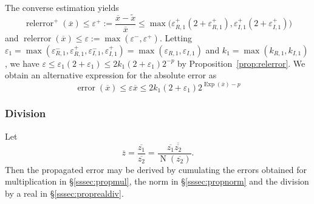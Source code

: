 \documentclass {article}
\newcommand {\corr}[1]{\widetilde {#1}}
\newcommand {\appro}[1]{\overline {#1}}
\DeclareMathOperator{\Exp}{\operatorname {Exp}}
\newcommand{\error}{\operatorname {error}}
\newcommand{\relerror}{\operatorname {relerror}}
\newcommand{\Norm}{\operatorname {N}}
\renewcommand {\epsilon}{\varepsilon}
\renewcommand {\leq}{\leqslant}
\begin{document}
The converse estimation yields
\begin {equation}
\label {eq:propnormepsplus}
\relerror^+ (\appro x)
\leq
\epsilon^+
:=
\frac {\appro x - \corr x}{\appro x}
\leq
\max \big(
   \epsilon_{R, 1}^+ (2 + \epsilon_{R, 1}^+),
   \epsilon_{I, 1}^+ (2 + \epsilon_{I, 1}^+)
\big)
\end {equation}
and $\relerror (\appro x) \leq \epsilon := \max (\epsilon^-, \epsilon^+)$.
Letting
$\epsilon_1 = \max ( \epsilon_{R, 1}^-, \epsilon_{R, 1}^+,
                     \epsilon_{I, 1}^-, \epsilon_{I, 1}^+ )
            = \max ( \epsilon_{R, 1},   \epsilon_{I, 1} )$
and $k_1 = \max ( k_{R, 1}, k_{I, 1})$,
we have
$\epsilon \leq \epsilon_1 (2 + \epsilon_1) \leq 2 k_1 (2 + \epsilon_1) 2^{-p}$
by Proposition~\ref {prop:relerror}.
We obtain an alternative expression for the absolute error as
\begin {equation}
\label {eq:propnormalt}
\error (\appro x) \leq \epsilon \appro x
\leq
2 k_1 (2 + \epsilon_1) 2^{\Exp (\appro x) - p}
\end {equation}


\subsubsection {Division}
\label{sssec:propdiv}

Let
\[
\appro z = \frac {\appro {z_1}}{\appro {z_2}}
= \frac {\appro {z_1} \overline {\appro {z_2}}}{\Norm (\appro {z_2})}.
\]
Then the propagated error may be derived by cumulating the errors obtained
for multiplication in \S\ref {sssec:propmul}, the norm in
\S\ref {sssec:propnorm} and the division by a real in
\S\ref {sssec:proprealdiv}.
\end{document}
